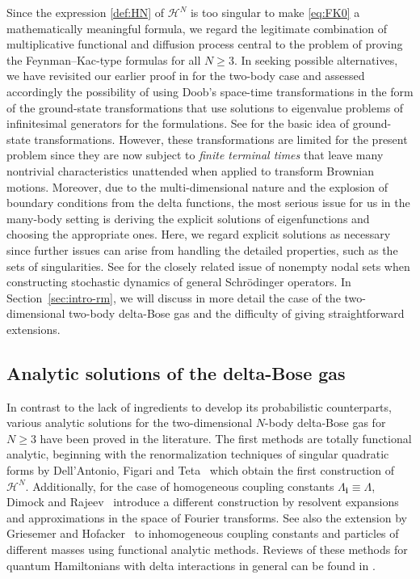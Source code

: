 \documentclass[12pt, twoside]{article}
\numberwithin{figure}{section}
\newcommand{\1}{\mathds 1}
\newcommand{\ms}{\mathscr}
\newcommand{\2}{{\mathbf 1}}
\newcommand{\bi}{\mathbf i}
\begin{document}
Since the expression \eqref{def:HN} of $\ms H^N$ is too singular to make \eqref{eq:FK0} a mathematically meaningful formula, we regard the legitimate combination of multiplicative functional and diffusion process central to the problem of proving the Feynman--Kac-type formulas for all $N\geq 3$. In seeking possible alternatives, we have revisited our earlier proof in \cite{C:BES} for the two-body case and assessed accordingly the possibility of using Doob's space-time transformations in the form of the ground-state transformations that use solutions to eigenvalue problems of infinitesimal generators for the formulations. See \cite[pp.172-173]{Simon:FIQP} for the basic idea of ground-state transformations. However, these transformations are limited for the present problem since they are now subject to \emph{finite terminal times} that leave many nontrivial characteristics unattended when applied to transform Brownian motions. Moreover, due to the multi-dimensional nature and the explosion of boundary conditions from the delta functions, the most serious issue for us in the many-body setting is deriving the explicit solutions of eigenfunctions and choosing the appropriate ones. Here, we regard explicit solutions as necessary since further issues can arise from handling the detailed properties, such as the sets of singularities. See \cite{Nagasawa} for the closely related issue of nonempty nodal sets when constructing stochastic dynamics of general Schr\"odinger operators. In Section~\ref{sec:intro-rm}, we will discuss in more detail the case of the two-dimensional two-body delta-Bose gas and the difficulty of giving straightforward extensions. 

\subsection{Analytic solutions of the delta-Bose gas}\label{sec:intro-analytic}
In contrast to the lack of ingredients to develop its probabilistic counterparts, various analytic solutions for the two-dimensional $N$-body delta-Bose gas for $N\geq 3$ have been proved in the literature. The first methods are totally functional analytic, beginning with the renormalization techniques of singular quadratic forms by Dell'Antonio, Figari and Teta~\cite{DFT:Schrodinger} which obtain the first construction of $\ms H^N$. Additionally, for the case of homogeneous coupling constants $\Lambda_\bi\equiv\Lambda$, Dimock and Rajeev~\cite{DR:Schrodinger} introduce a different construction by resolvent expansions and approximations in the space of Fourier transforms. See also the extension by Griesemer and Hofacker~\cite{GH:Short} to inhomogeneous coupling constants and particles of different masses using functional analytic methods. Reviews of these methods for quantum Hamiltonians with delta interactions in general can be found in \cite{AGHH:Solvable,GM:SA}.
\end{document}
